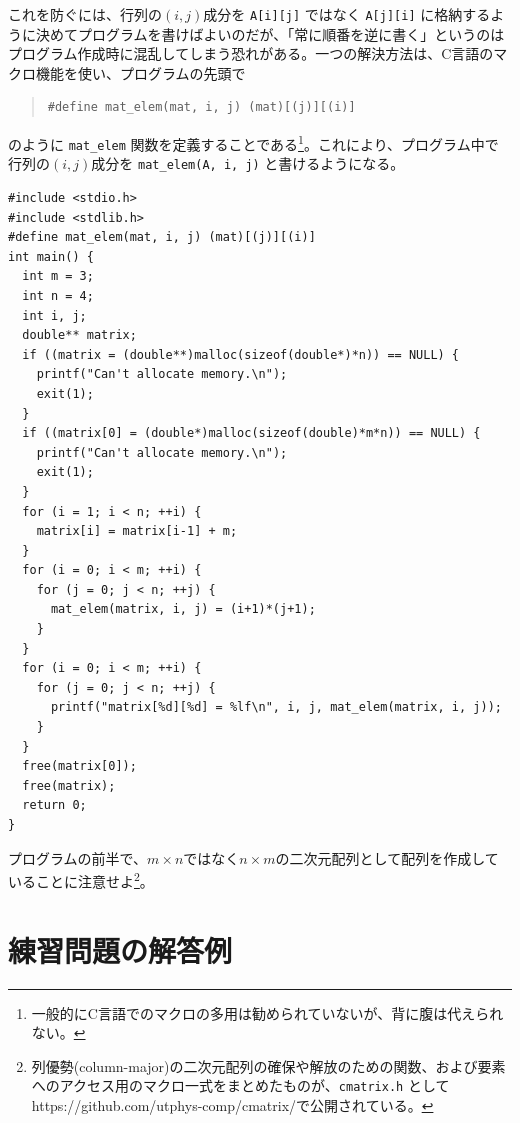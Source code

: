 これを防ぐには、行列の$(i,j)$成分を \verb|A[i][j]| ではなく \verb|A[j][i]| に格納するように決めてプログラムを書けばよいのだが、「常に順番を逆に書く」というのはプログラム作成時に混乱してしまう恐れがある。一つの解決方法は、C言語のマクロ機能を使い、プログラムの先頭で
\begin{quote}
\begin{verbatim}
#define mat_elem(mat, i, j) (mat)[(j)][(i)]
\end{verbatim}
\end{quote}
のように \verb|mat_elem| 関数を定義することである\footnote{一般的にC言語でのマクロの多用は勧められていないが、背に腹は代えられない。}。これにより、プログラム中で行列の$(i,j)$成分を \verb|mat_elem(A, i, j)| と書けるようになる。
\begin{reidai}\label{ex:malloc-2dim-column-major}
\begin{verbatim}
#include <stdio.h>
#include <stdlib.h>
#define mat_elem(mat, i, j) (mat)[(j)][(i)]
int main() {
  int m = 3;
  int n = 4;
  int i, j;
  double** matrix;
  if ((matrix = (double**)malloc(sizeof(double*)*n)) == NULL) {
    printf("Can't allocate memory.\n");
    exit(1);
  }
  if ((matrix[0] = (double*)malloc(sizeof(double)*m*n)) == NULL) {
    printf("Can't allocate memory.\n");
    exit(1);
  }
  for (i = 1; i < n; ++i) {
    matrix[i] = matrix[i-1] + m;
  }
  for (i = 0; i < m; ++i) {
    for (j = 0; j < n; ++j) {
      mat_elem(matrix, i, j) = (i+1)*(j+1);
    }
  }
  for (i = 0; i < m; ++i) {
    for (j = 0; j < n; ++j) {
      printf("matrix[%d][%d] = %lf\n", i, j, mat_elem(matrix, i, j));
    }
  }
  free(matrix[0]);
  free(matrix);
  return 0;
}
\end{verbatim}
\end{reidai} \noindent
プログラムの前半で、$m \times n$ではなく$n \times m$の二次元配列として配列を作成していることに注意せよ\footnote{列優勢(column-major)の二次元配列の確保や解放のための関数、および要素へのアクセス用のマクロ一式をまとめたものが、{\tt cmatrix.h} として{https://github.com/utphys-comp/cmatrix/}で公開されている。}。

\section{練習問題の解答例}

